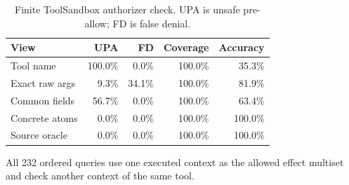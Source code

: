 \begin{table}[t]
\centering
\scriptsize
\setlength{\tabcolsep}{2.5pt}
\caption{Finite ToolSandbox authorizer check. UPA is unsafe pre-allow; FD is false denial.}
\label{tab:concrete-atom-authorizer}
\begin{tabular}{@{}lrrrr@{}}
\toprule
View & UPA & FD & Coverage & Accuracy \\
\midrule
Tool name & 100.0\% & 0.0\% & 100.0\% & 35.3\% \\
Exact raw args & 9.3\% & 34.1\% & 100.0\% & 81.9\% \\
Common fields & 56.7\% & 0.0\% & 100.0\% & 63.4\% \\
Concrete atoms & 0.0\% & 0.0\% & 100.0\% & 100.0\% \\
Source oracle & 0.0\% & 0.0\% & 100.0\% & 100.0\% \\
\bottomrule
\end{tabular}
\vspace{2pt}\parbox{0.98\linewidth}{\footnotesize All 232 ordered queries use one executed context as the allowed effect multiset and check another context of the same tool.}
\end{table}
